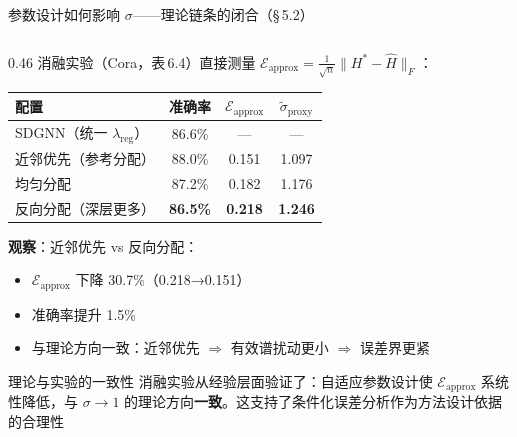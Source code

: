 \documentclass[aspectratio=169,9pt,xcolor=dvipsnames]{beamer}
\newcommand{\highlight}[1]{\textcolor{myred}{\textbf{#1}}}
\newcommand{\green}[1]{\textcolor{mygreen}{#1}}
\begin{document}
\begin{frame}{参数设计如何影响 $\sigma$——理论链条的闭合（§\,5.2）}
\begin{columns}[T]
\begin{column}{0.46\textwidth}
  消融实验（Cora，表\,6.4）直接测量 $\mathcal{E}_{\mathrm{approx}}=\frac{1}{\sqrt{n}}\|H^*-\hat{H}\|_F$：

  \vspace{0.15cm}
  \begin{tabular}{m{3.0cm}ccc}
    \toprule
    配置 & 准确率 & $\mathcal{E}_{\mathrm{approx}}$ & $\widetilde{\sigma}_{\mathrm{proxy}}$ \\
    \midrule
    SDGNN（统一 $\lambda_{\mathrm{reg}}$） & 86.6\% & — & — \\
    近邻优先（参考分配） & \green{88.0\%} & \green{0.151} & \green{1.097} \\
    均匀分配 & 87.2\% & 0.182 & 1.176 \\
    反向分配（深层更多） & \highlight{86.5\%} & \highlight{0.218} & \highlight{1.246} \\
    \bottomrule
  \end{tabular}

  \vspace{0.15cm}
  \textbf{观察}：近邻优先 vs 反向分配：
  \begin{itemize}\setlength{\itemsep}{2pt}
    \item $\mathcal{E}_{\mathrm{approx}}$ 下降 30.7\%（0.218→0.151）
    \item 准确率提升 1.5\%
    \item 与理论方向一致：近邻优先 $\Rightarrow$ 有效谱扰动更小 $\Rightarrow$ 误差界更紧
  \end{itemize}

  \vspace{-0.15cm}
  \begin{block}{理论与实验的一致性}
    消融实验从经验层面验证了：自适应参数设计使 $\mathcal{E}_{\mathrm{approx}}$ 系统性降低，与 $\sigma\to 1$ 的理论方向\textbf{一致}。这支持了条件化误差分析作为方法设计依据的合理性
  \end{block}
\end{column}
\end{columns}
\end{frame}
\end{document}
